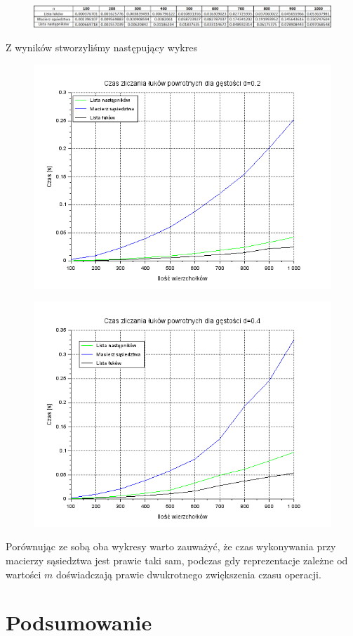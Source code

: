 \documentclass{article}
\begin{document}
\begin{figure}[h]
\centering
\includegraphics[width=1.0\linewidth]{luki_reprezentacje_tabela2}
\label{fig:luki_reprezentacje_tabela2}
\end{figure}%

Z wyników stworzyliśmy następujący wykres

\begin{figure}[h]
\centering
\includegraphics[width=0.5\linewidth]{luki_reprezentacje}
\label{fig:luki_reprezentacje}
\end{figure}%

\begin{figure}[h]
\centering
\includegraphics[width=0.5\linewidth]{luki_reprezentacje2}
\label{fig:luki_reprezentacje2}
\end{figure}%

Porównując ze sobą oba wykresy warto zauważyć, że czas wykonywania przy macierzy sąsiedztwa jest prawie taki sam, podczas gdy reprezentacje zależne od wartości $m$ doświadczają prawie dwukrotnego zwiększenia czasu operacji.

\section{Podsumowanie}
\end{document}
